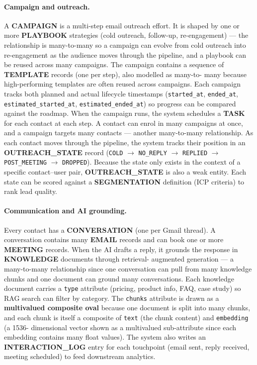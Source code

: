 \documentclass[a4paper]{article}
\begin{document}
\paragraph{Campaign and outreach.}
A \textbf{CAMPAIGN} is a multi-step email outreach effort. It is
shaped by one or more \textbf{PLAYBOOK} strategies (cold outreach,
follow-up, re-engagement) --- the relationship is many-to-many so a
campaign can evolve from cold outreach into re-engagement as the
audience moves through the pipeline, and a playbook can be reused
across many campaigns. The campaign contains a sequence of
\textbf{TEMPLATE} records (one per step), also modelled as many-to-
many because high-performing templates are often reused across
campaigns. Each campaign tracks both planned and actual lifecycle
timestamps (\texttt{started\_at}, \texttt{ended\_at},
\texttt{estimated\_started\_at}, \texttt{estimated\_ended\_at}) so
progress can be compared against the roadmap. When the campaign runs,
the system schedules a \textbf{TASK} for each contact at each step.
A contact can enrol in many campaigns at once, and a campaign targets
many contacts --- another many-to-many relationship. As each contact
moves through the pipeline, the system tracks their position in an
\textbf{OUTREACH\_STATE} record (\texttt{COLD} $\rightarrow$
\texttt{NO\_REPLY} $\rightarrow$ \texttt{REPLIED} $\rightarrow$
\texttt{POST\_MEETING} $\rightarrow$ \texttt{DROPPED}). Because the
state only exists in the context of a specific contact--user pair,
\textbf{OUTREACH\_STATE} is also a weak entity. Each state can be
scored against a \textbf{SEGMENTATION} definition (ICP criteria) to
rank lead quality.



\paragraph{Communication and AI grounding.}
Every contact has a \textbf{CONVERSATION} (one per Gmail thread). A
conversation contains many \textbf{EMAIL} records and can book one or
more \textbf{MEETING} records. When the AI drafts a reply, it grounds
the response in \textbf{KNOWLEDGE} documents through retrieval-
augmented generation --- a many-to-many relationship since one
conversation can pull from many knowledge chunks and one document can
ground many conversations. Each knowledge document carries a
\texttt{type} attribute (pricing, product info, FAQ, case study) so
RAG search can filter by category. The \texttt{chunks} attribute is
drawn as a \textbf{multivalued composite oval} because one document
is split into many chunks, and each chunk is itself a composite of
\texttt{text} (the chunk content) and \texttt{embedding} (a 1536-
dimensional vector shown as a multivalued sub-attribute since each
embedding contains many float values). The system also writes an
\textbf{INTERACTION\_LOG} entry for each touchpoint (email sent,
reply received, meeting scheduled) to feed downstream analytics.
\end{document}
